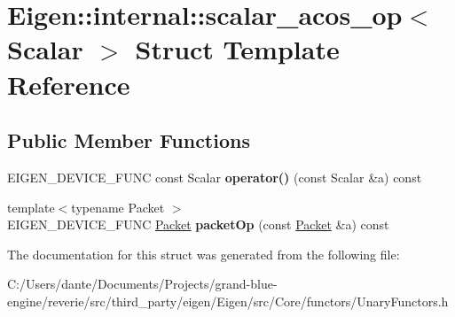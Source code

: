 \hypertarget{struct_eigen_1_1internal_1_1scalar__acos__op}{}\section{Eigen\+::internal\+::scalar\+\_\+acos\+\_\+op$<$ Scalar $>$ Struct Template Reference}
\label{struct_eigen_1_1internal_1_1scalar__acos__op}
\subsection*{Public Member Functions}
\begin{DoxyCompactItemize}
\item 
\mbox{\label{struct_eigen_1_1internal_1_1scalar__acos__op_a7606bbbad868c2c9ab35227e9463978b}} 
E\+I\+G\+E\+N\+\_\+\+D\+E\+V\+I\+C\+E\+\_\+\+F\+U\+NC const Scalar {\bfseries operator()} (const Scalar \&a) const
\item 
\mbox{\label{struct_eigen_1_1internal_1_1scalar__acos__op_a7a0b3bb76364cfa0d5f90dd9a688e31f}} 
{\footnotesize template$<$typename Packet $>$ }\\E\+I\+G\+E\+N\+\_\+\+D\+E\+V\+I\+C\+E\+\_\+\+F\+U\+NC \mbox{\hyperlink{union_eigen_1_1internal_1_1_packet}{Packet}} {\bfseries packet\+Op} (const \mbox{\hyperlink{union_eigen_1_1internal_1_1_packet}{Packet}} \&a) const
\end{DoxyCompactItemize}


The documentation for this struct was generated from the following file\+:\begin{DoxyCompactItemize}
\item 
C\+:/\+Users/dante/\+Documents/\+Projects/grand-\/blue-\/engine/reverie/src/third\+\_\+party/eigen/\+Eigen/src/\+Core/functors/Unary\+Functors.\+h\end{DoxyCompactItemize}
